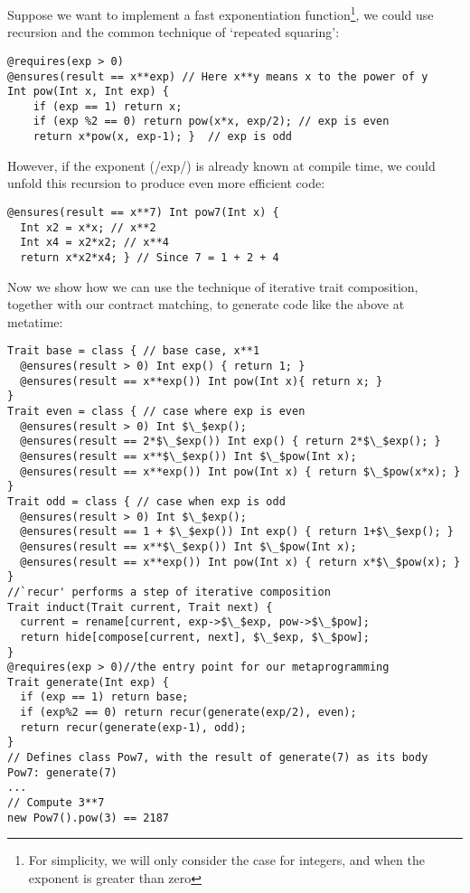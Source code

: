 Suppose we want to implement a fast exponentiation function\footnote{For simplicity, we will only consider the case for integers, and when the exponent is greater than zero}, we could use recursion and the common technique of `repeated squaring':
\begin{lstlisting}
@requires(exp > 0)
@ensures(result == x**exp) // Here x**y means x to the power of y
Int pow(Int x, Int exp) {
	if (exp == 1) return x;
	if (exp %2 == 0) return pow(x*x, exp/2); // exp is even
	return x*pow(x, exp-1); }  // exp is odd
\end{lstlisting}

However, if the exponent (/exp/) is already known at compile time, we could unfold this recursion to produce even more efficient code:
\begin{lstlisting}
@ensures(result == x**7) Int pow7(Int x) { 
  Int x2 = x*x; // x**2
  Int x4 = x2*x2; // x**4
  return x*x2*x4; } // Since 7 = 1 + 2 + 4
\end{lstlisting}

Now we show how we can use the technique of iterative trait composition, together with our contract matching, to generate code like the above at metatime:
\begin{lstlisting}
Trait base = class { // base case, x**1
  @ensures(result > 0) Int exp() { return 1; }
  @ensures(result == x**exp()) Int pow(Int x){ return x; }
}
Trait even = class { // case where exp is even
  @ensures(result > 0) Int $\_$exp();
  @ensures(result == 2*$\_$exp()) Int exp() { return 2*$\_$exp(); }
  @ensures(result == x**$\_$exp()) Int $\_$pow(Int x);
  @ensures(result == x**exp()) Int pow(Int x) { return $\_$pow(x*x); }
}
Trait odd = class { // case when exp is odd
  @ensures(result > 0) Int $\_$exp();
  @ensures(result == 1 + $\_$exp()) Int exp() { return 1+$\_$exp(); }
  @ensures(result == x**$\_$exp()) Int $\_$pow(Int x);
  @ensures(result == x**exp()) Int pow(Int x) { return x*$\_$pow(x); }
}
//`recur' performs a step of iterative composition
Trait induct(Trait current, Trait next) {
  current = rename[current, exp->$\_$exp, pow->$\_$pow];
  return hide[compose[current, next], $\_$exp, $\_$pow];
}
@requires(exp > 0)//the entry point for our metaprogramming
Trait generate(Int exp) {
  if (exp == 1) return base;
  if (exp%2 == 0) return recur(generate(exp/2), even);
  return recur(generate(exp-1), odd);
}
// Defines class Pow7, with the result of generate(7) as its body
Pow7: generate(7)
...
// Compute 3**7
new Pow7().pow(3) == 2187
\end{lstlisting}